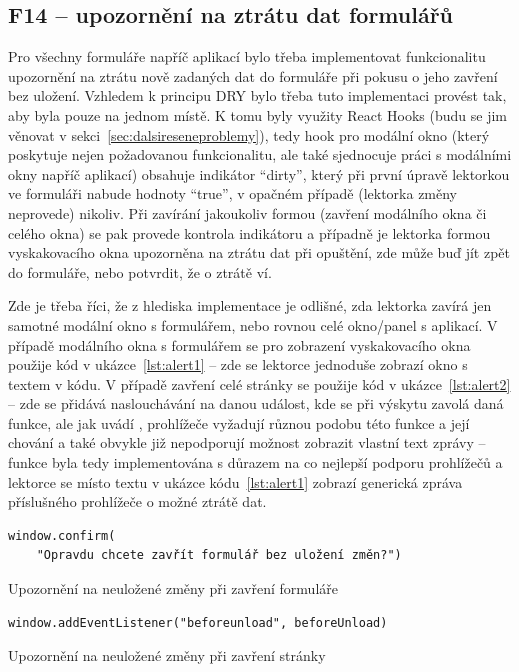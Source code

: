 \subsection{F14 -- upozornění na ztrátu dat formulářů}

Pro všechny formuláře napříč aplikací bylo třeba implementovat funkcionalitu upozornění na ztrátu nově zadaných dat do formuláře při pokusu o jeho zavření bez uložení. Vzhledem k principu DRY bylo třeba tuto implementaci provést tak, aby byla pouze na jednom místě. K tomu byly využity React Hooks (budu se jim věnovat v sekci~\ref{sec:dalsireseneproblemy}), tedy hook pro modální okno (který poskytuje nejen požadovanou funkcionalitu, ale také sjednocuje práci s modálními okny napříč aplikací) obsahuje indikátor \enquote{dirty}, který při první úpravě lektorkou ve formuláři nabude hodnoty \enquote{true}, v opačném případě (lektorka změny neprovede) nikoliv. Při zavírání jakoukoliv formou (zavření modálního okna či celého okna) se pak provede kontrola indikátoru a případně je lektorka formou vyskakovacího okna upozorněna na ztrátu dat při opuštění, zde může buď jít zpět do formuláře, nebo potvrdit, že o ztrátě ví.

Zde je třeba říci, že z hlediska implementace je odlišné, zda lektorka zavírá jen samotné modální okno s formulářem, nebo rovnou celé okno/panel s aplikací. V případě modálního okna s formulářem se pro zobrazení vyskakovacího okna použije kód v ukázce~\ref{lst:alert1} -- zde se lektorce jednoduše zobrazí okno s textem v kódu. V případě zavření celé stránky se použije kód v ukázce~\ref{lst:alert2} -- zde se přidává naslouchávání na danou událost, kde se při výskytu zavolá daná funkce, ale jak uvádí \cite{mdn-beforeunload}, prohlížeče vyžadují různou podobu této funkce a její chování a také obvykle již nepodporují možnost zobrazit vlastní text zprávy -- funkce byla tedy implementována s důrazem na co nejlepší podporu prohlížečů a lektorce se místo textu v ukázce kódu~\ref{lst:alert1} zobrazí generická zpráva příslušného prohlížeče o možné ztrátě dat.

\begin{listing}[ht]
	\begin{verbatim}
window.confirm(
    "Opravdu chcete zavřít formulář bez uložení změn?")
	\end{verbatim}
	\caption{Upozornění na neuložené změny při zavření formuláře}\label{lst:alert1}
\end{listing}

\begin{listing}[ht]
	\begin{verbatim}
window.addEventListener("beforeunload", beforeUnload)
	\end{verbatim}
	\caption{Upozornění na neuložené změny při zavření stránky}\label{lst:alert2}
\end{listing}

